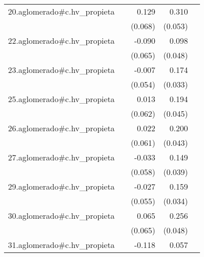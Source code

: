 {\begin{longtable}{l*{4}{D{.}{.}{-1}}}
\addlinespace
20.aglomerado#c.hv\_propieta&                     &       0.129         &       0.310\sym{***}&                     \\
            &                     &     (0.068)         &     (0.053)         &                     \\
\addlinespace
22.aglomerado#c.hv\_propieta&                     &      -0.090         &       0.098\sym{*}  &                     \\
            &                     &     (0.065)         &     (0.048)         &                     \\
\addlinespace
23.aglomerado#c.hv\_propieta&                     &      -0.007         &       0.174\sym{***}&                     \\
            &                     &     (0.054)         &     (0.033)         &                     \\
\addlinespace
25.aglomerado#c.hv\_propieta&                     &       0.013         &       0.194\sym{***}&                     \\
            &                     &     (0.062)         &     (0.045)         &                     \\
\addlinespace
26.aglomerado#c.hv\_propieta&                     &       0.022         &       0.200\sym{***}&                     \\
            &                     &     (0.061)         &     (0.043)         &                     \\
\addlinespace
27.aglomerado#c.hv\_propieta&                     &      -0.033         &       0.149\sym{***}&                     \\
            &                     &     (0.058)         &     (0.039)         &                     \\
\addlinespace
29.aglomerado#c.hv\_propieta&                     &      -0.027         &       0.159\sym{***}&                     \\
            &                     &     (0.055)         &     (0.034)         &                     \\
\addlinespace
30.aglomerado#c.hv\_propieta&                     &       0.065         &       0.256\sym{***}&                     \\
            &                     &     (0.065)         &     (0.048)         &                     \\
\addlinespace
31.aglomerado#c.hv\_propieta&                     &      -0.118         &       0.057         &                     \\

\end{longtable}}
